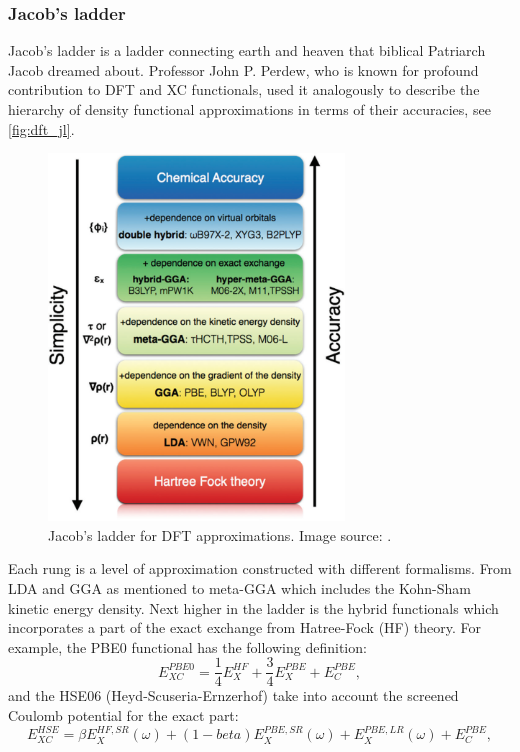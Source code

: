 \subsubsection{Jacob's ladder}
Jacob's ladder is a ladder connecting earth and heaven that biblical Patriarch Jacob dreamed about. Professor John P. Perdew, who is known for profound contribution to DFT and XC functionals, used it analogously to describe the hierarchy of density functional approximations in terms of their accuracies, see \autoref{fig:dft_jl}.  
\begin{figure}[htbp!] 
\centering  
\includegraphics[width=0.7\textwidth]{jacobs.png}
\caption{ Jacob's ladder for DFT approximations. Image source: \cite{Peng2016}.}  
\label{fig:dft_jl}
\end{figure} 
Each rung is a level of approximation constructed with different formalisms. From LDA and GGA as mentioned to meta-GGA which includes the Kohn-Sham kinetic energy density. Next higher in the ladder is the hybrid functionals which incorporates a part of the exact exchange from Hatree-Fock (HF) theory. For example, the PBE0 functional\cite{Carlo1999} has the following definition:
\begin{equation}
E_{XC}^{PBE0}=\frac{1}{4}E_X^{HF}+\frac{3}{4}E_X^{PBE}+E_C^{PBE},
\end{equation}
and the HSE06 (Heyd-Scuseria-Ernzerhof)\cite{Jochen2003} take into account the screened Coulomb potential for the exact part:
\begin{equation}
E_{XC}^{HSE}=\beta E_X^{HF,SR}(\omega)+(1-beta)E_X^{PBE,SR}(\omega)+E_X^{PBE,LR}(\omega)+E_C^{PBE},
\end{equation}
